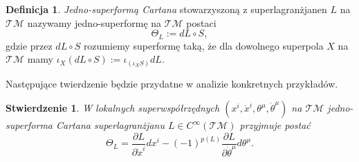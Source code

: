 \documentclass[11pt,a4paper]{report}
\newtheorem{proposition}[theorem]{Stwierdzenie}
\theoremstyle{definition}
\newtheorem{definition}[theorem]{Definicja}
\begin{document}
			      				
\begin{definition}
	\textit{Jedno-superformą Cartana} stowarzyszoną z superlagranżjanen $L$ na $\mathcal{TM}$ nazywamy jedno-superformę na $\mathcal{TM}$ postaci
	\begin{equation}\label{2Car}
		\Theta_L := dL \circ S,
	\end{equation}
	gdzie przez $dL \circ S$ rozumiemy superformę taką, że dla dowolnego superpola $X$ na $\mathcal{TM}$ mamy $\iota_X (dL \circ S) := \iota_{(\iota_X S)} dL.$
\end{definition}
			      				
Następujące twierdzenie będzie przydatne w analizie konkretnych przykładów. \cite{carinena}
			      				
\begin{proposition}
	W lokalnych superwspółrzędnych $(x^i, \dot x^i, \theta^\mu, \dot \theta^\mu)$ na $\mathcal{TM}$ jedno-superforma Cartana superlagranżjanu $L\in C^\infty(\mathcal{TM})$ przyjmuje postać
	\begin{equation}
		\label{eq:superpoincare}
		\Theta_L = \frac{\partial L}{\partial \dot{x}^i} dx^i - (-1)^{p(L)}  \frac{\partial L}{\partial \dot{\theta}^\mu} d\theta^\mu.
	\end{equation}
\end{proposition}
			      				
\end{document}
